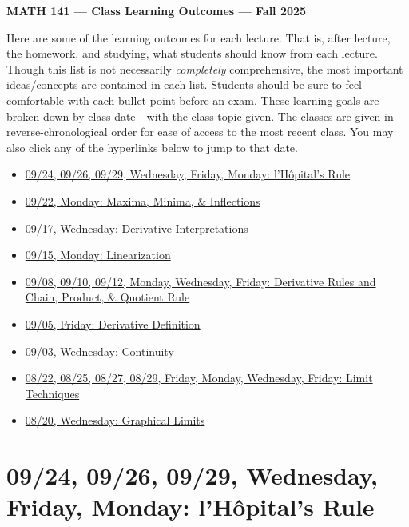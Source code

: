 \documentclass[11pt,letterpaper]{article}
\begin{document}
\begin{center} {\bfseries \LARGE MATH 141 --- Class Learning Outcomes --- Fall 2025} \end{center}

Here are some of the learning outcomes for each lecture. That is, after lecture, the homework, and studying, what students should know from each lecture. Though this list is not necessarily \textit{completely} comprehensive, the most important ideas/concepts are contained in each list. Students should be sure to feel comfortable with each bullet point before an exam. These learning goals are broken down by class date---with the class topic given. The classes are given in reverse-chronological order for ease of access to the most recent class. You may also click any of the hyperlinks below to jump to that date. 

\begin{itemize}
\item \hyperref[09-24]{09/24, 09/26, 09/29, Wednesday, Friday, Monday: l'H\^{o}pital's Rule}
\item \hyperref[09-22]{09/22, Monday: Maxima, Minima, \& Inflections}
\item \hyperref[09-17]{09/17, Wednesday: Derivative Interpretations}
\item \hyperref[09-15]{09/15, Monday: Linearization}
\item \hyperref[09-08--09-12]{09/08, 09/10, 09/12, Monday, Wednesday, Friday: Derivative Rules and Chain, Product, \& Quotient Rule}
\item \hyperref[09-05]{09/05, Friday: Derivative Definition}
\item \hyperref[09-03]{09/03, Wednesday: Continuity}
\item \hyperref[08-22--08-29]{08/22, 08/25, 08/27, 08/29, Friday, Monday, Wednesday, Friday: Limit Techniques}
\item \hyperref[08-20]{08/20, Wednesday: Graphical Limits}
\end{itemize}

\newpage
\section*{09/24, 09/26, 09/29, Wednesday, Friday, Monday: l'H\^{o}pital's Rule\label{09-24}}
\end{document}
